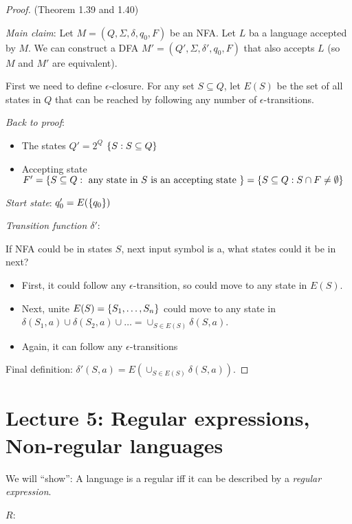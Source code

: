\begin{proof}
    (Theorem 1.39 and 1.40)

    \emph{Main claim}: Let $M = (Q, \Sigma, \delta, q_0, F)$ be an NFA. Let $L$ ba a language accepted by $M$. We can construct a DFA $M' = (Q', \Sigma, \delta', q_0, F)$ that also accepts $L$ (so $M$ and $M'$ are equivalent).

    First we need to define $\epsilon$-closure. For any set $S \subseteq Q$, let \emph{$E(S)$} be the set of all states in $Q$ that can be reached by following any number of $\epsilon$-transitions.

    \emph{Back to proof}:

    \begin{itemize}
        \item The states $Q' = 2^Q$ $\left \{ S: S \subseteq Q \right \}$
        \item Accepting state $F' = \left \{ S \subseteq Q: \text{ any state in $S$ is an accepting state } \right \} = \left \{ S \subseteq Q: S \cap F \neq \emptyset  \right \}$
    \end{itemize}

    \emph{Start state}: $q_0' = E(\left \{ q_0 \right \})$

    \emph{Transition function $\delta'$}:

    If NFA could be in states $S$, next input symbol is a, what states could it be in next?
    \begin{itemize}
        \item First, it could follow any $\epsilon$-transition, so could move to any state in $E(S)$.
        \item Next, unite $E(S) = \left \{ S_1, \ldots, S_n \right \}$ could move to any state in $\delta(S_1, a) \cup \delta(S_2, a) \cup \ldots = \cup_{S \in E(S)} \delta(S, a)$.
        \item Again, it can follow any $\epsilon$-transitions
    \end{itemize}

    Final definition: $\delta'(S, a) = E(\cup_{S \in E(S)} \delta(S, a))$.
\end{proof}

\section*{Lecture 5: Regular expressions, Non-regular languages}

We will ``show'': A language is a regular iff it can be described by a \emph{regular expression}.

$R$:

